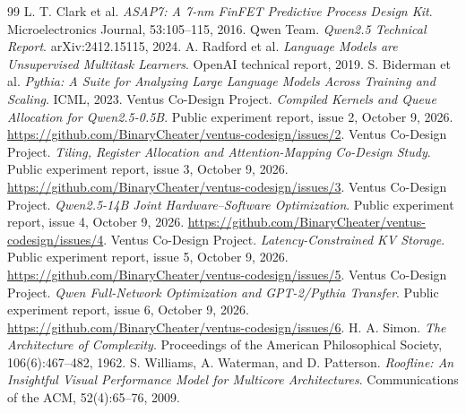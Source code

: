 \documentclass[11pt]{article}
\begin{document}
\begin{thebibliography}{99}
 L. T. Clark et al. \emph{ASAP7: A 7-nm FinFET Predictive Process Design Kit}. Microelectronics Journal, 53:105--115, 2016.
 Qwen Team. \emph{Qwen2.5 Technical Report}. arXiv:2412.15115, 2024.
 A. Radford et al. \emph{Language Models are Unsupervised Multitask Learners}. OpenAI technical report, 2019.
 S. Biderman et al. \emph{Pythia: A Suite for Analyzing Large Language Models Across Training and Scaling}. ICML, 2023.
 Ventus Co-Design Project. \emph{Compiled Kernels and Queue Allocation for Qwen2.5-0.5B}. Public experiment report, issue 2, October 9, 2026. \url{https://github.com/BinaryCheater/ventus-codesign/issues/2}.
 Ventus Co-Design Project. \emph{Tiling, Register Allocation and Attention-Mapping Co-Design Study}. Public experiment report, issue 3, October 9, 2026. \url{https://github.com/BinaryCheater/ventus-codesign/issues/3}.
 Ventus Co-Design Project. \emph{Qwen2.5-14B Joint Hardware--Software Optimization}. Public experiment report, issue 4, October 9, 2026. \url{https://github.com/BinaryCheater/ventus-codesign/issues/4}.
 Ventus Co-Design Project. \emph{Latency-Constrained KV Storage}. Public experiment report, issue 5, October 9, 2026. \url{https://github.com/BinaryCheater/ventus-codesign/issues/5}.
 Ventus Co-Design Project. \emph{Qwen Full-Network Optimization and GPT-2/Pythia Transfer}. Public experiment report, issue 6, October 9, 2026. \url{https://github.com/BinaryCheater/ventus-codesign/issues/6}.
 H. A. Simon. \emph{The Architecture of Complexity}. Proceedings of the American Philosophical Society, 106(6):467--482, 1962.
 S. Williams, A. Waterman, and D. Patterson. \emph{Roofline: An Insightful Visual Performance Model for Multicore Architectures}. Communications of the ACM, 52(4):65--76, 2009.
\end{thebibliography}
\end{document}
